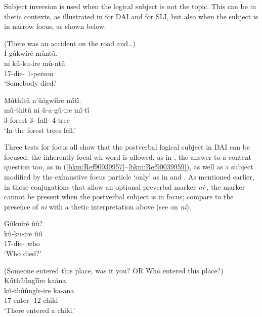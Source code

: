\documentclass[output=paper]{langscibook}
\begin{document}
\z


Subject inversion is used when the logical subject is not the topic. This can be in thetic contexts, as illustrated in  for DAI and  for SLI, but also when the subject is in narrow focus, as shown below.

\ea
\label{bkm:Ref90041020}
{(There was an accident on the road and…)}\\
Í g\'{û}kwíré mûntû.\\
\gll
ni  kû-ku-ire  mû-ntû\\
\FOC{}  17\SM{}-die-\PFV{}  1-person \\
\glt
‘Somebody died.’

\z

\ea
\label{bkm:Ref94171751}
Mûthítû n’ûágwîîre m\'{î}t\'{î}.\\
\gll
mû-thitû  ni  û-a-gû-ire  mî-tî\\
3-forest \FOC{} 3\SM{}-\PST{}-fall-\PFV{} 4-tree\\
\glt
‘In the forest trees fell.’

\z

Three tests for focus all show that the postverbal logical subject in DAI can be focused: the inherently focal wh word is allowed, as in , the answer to a content question too, as in (\ref{bkm:Ref90039957}--\ref{bkm:Ref90039959}), as well as a subject modified by the exhaustive focus particle ‘only’ as in  and . As mentioned earlier, in those conjugations that allow an optional preverbal marker \textit{ni}-, the marker cannot be present when the postverbal subject is in focus; compare to the presence of \textit{ni} with a thetic interpretation above (see  on \textit{ni}).

\ea
\label{bkm:Ref90039199}
Gûkuíré ûû?\\
\gll
kû-ku-ire  ûû\\
17\SM{}-die-\PFV{} who \\
\glt
‘Who died?’

\z

\ea
\label{bkm:Ref90039957}
(Someone entered this place, was it you? OR Who entered this place?)\\
K\'{û}th\'{û}\'{û}ng\'{î}\'{î}re kaána.\\
\gll
kû-thûûngîr-ire  ka-ana\\
17\SM{}-enter-\PFV{} 12-child \\
\glt
‘There entered a child.’
\end{document}
